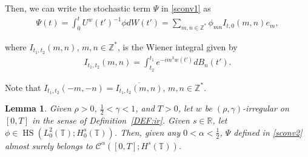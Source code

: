 \documentclass[letterpaper, 11pt,  reqno]{amsart}
\newtheorem{lemma}[theorem]{Lemma}
\DeclareMathOperator{\HS}{HS}
\newcommand{\1}{\hspace{0.5mm}\text{I}\hspace{0.5mm}}
\newcommand{\noi}{\noindent}
\newcommand{\Z}{\mathbb{Z}}
\newcommand{\R}{\mathbb{R}}
\newcommand{\T}{\mathbb{T}}
\newcommand{\CC}{\mathcal{C}}
\newcommand{\al}{\alpha}
\newcommand{\g}{\gamma}
\newcommand{\cj}{\overline}
\newcommand{\uw}{U^w}
\numberwithin{equation}{section}
\numberwithin{theorem}{section}
\begin{document}
\noi

\noi
Then, we can write the stochastic term $\Psi$ in \eqref{sconv1}
as 
\begin{align}
\Psi(t) = \int_0^t \uw(t')^{-1}\phi dW(t')
= \sum_{m,n\in\Z^*} \phi_{mn} I_{t,0}(m, n)e_m, 
\label{sconv2}
\end{align}



\noi
where $I_{t_1,t_2}(m,n)$, $m,n\in\Z^*$,
is the Wiener integral given by
\begin{align}
I_{t_1,t_2}(m,n)
= \int_{t_2}^{t_1} e^{-im^3w(t')}dB_n(t').
\label{sconv3}
\end{align}

\noi
Note that
$I_{t_1,t_2}(-m,-n)=\cj{I_{t_1,t_2}(m,n)}$,
$m,n\in\Z^*$.

\begin{lemma}\label{LEM:sto1}
Given $\rho >0$,  $\frac 12 < \g < 1$, and $T> 0$, 
let  $w$ be $(\rho,\g)$-irregular on $[0, T]$ in the sense of Definition~\ref{DEF:ir}.
Given $s \in \R$, 
let $\phi \in \HS(L^2_0(\T); H^s_0(\T))$.
Then, 
given any $0<  \al < \frac 12$, 
$\Psi$ defined in \eqref{sconv2}
almost surely belongs to 
 $ \CC^\al([0, T]; H^s(\T))$.



\end{lemma}
\end{document}
